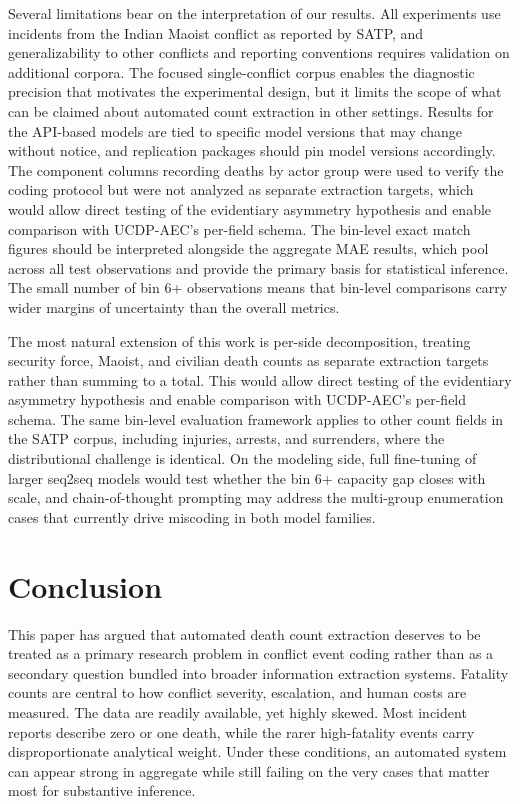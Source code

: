 \documentclass[
  11pt,
]{article}
\begin{document}
Several limitations bear on the interpretation of our results. All
experiments use incidents from the Indian Maoist conflict as reported by
SATP, and generalizability to other conflicts and reporting conventions
requires validation on additional corpora. The focused single-conflict
corpus enables the diagnostic precision that motivates the experimental
design, but it limits the scope of what can be claimed about automated
count extraction in other settings. Results for the API-based models are
tied to specific model versions that may change without notice, and
replication packages should pin model versions accordingly. The
component columns recording deaths by actor group were used to verify
the coding protocol but were not analyzed as separate extraction
targets, which would allow direct testing of the evidentiary asymmetry
hypothesis and enable comparison with UCDP-AEC's per-field schema. The
bin-level exact match figures should be interpreted alongside the
aggregate MAE results, which pool across all test observations and
provide the primary basis for statistical inference. The small number of
bin 6+ observations means that bin-level comparisons carry wider margins
of uncertainty than the overall metrics.

The most natural extension of this work is per-side decomposition,
treating security force, Maoist, and civilian death counts as separate
extraction targets rather than summing to a total. This would allow
direct testing of the evidentiary asymmetry hypothesis and enable
comparison with UCDP-AEC's per-field schema. The same bin-level
evaluation framework applies to other count fields in the SATP corpus,
including injuries, arrests, and surrenders, where the distributional
challenge is identical. On the modeling side, full fine-tuning of larger
seq2seq models would test whether the bin 6+ capacity gap closes with
scale, and chain-of-thought prompting may address the multi-group
enumeration cases that currently drive miscoding in both model families.

\section{Conclusion}\label{conclusion}

This paper has argued that automated death count extraction deserves to
be treated as a primary research problem in conflict event coding rather
than as a secondary question bundled into broader information extraction
systems. Fatality counts are central to how conflict severity,
escalation, and human costs are measured. The data are readily
available, yet highly skewed. Most incident reports describe zero or one
death, while the rarer high-fatality events carry disproportionate
analytical weight. Under these conditions, an automated system can
appear strong in aggregate while still failing on the very cases that
matter most for substantive inference.
\end{document}
